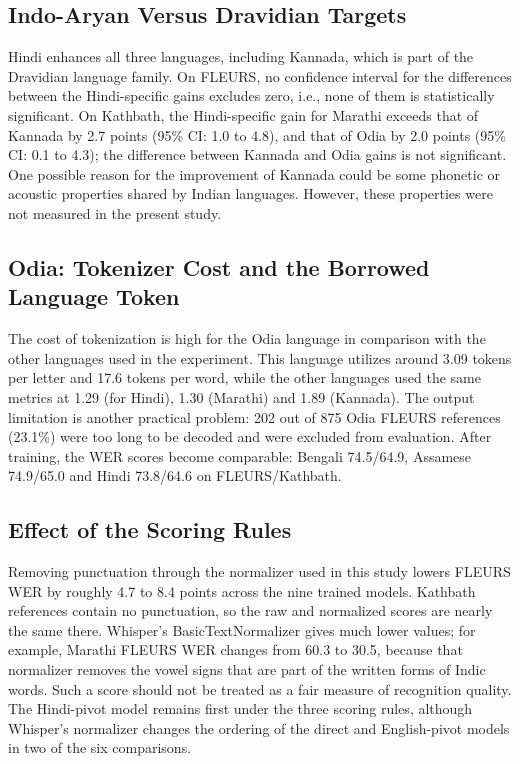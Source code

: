 \documentclass[conference]{IEEEtran}
\begin{document}


\subsection{Indo-Aryan Versus Dravidian Targets}

Hindi enhances all three languages, including Kannada, which is part of the Dravidian language family. On FLEURS, no confidence interval for the differences between the Hindi-specific gains excludes zero, i.e., none of them is statistically significant. On Kathbath, the Hindi-specific gain for Marathi exceeds that of Kannada by 2.7 points (95\% CI: 1.0 to 4.8), and that of Odia by 2.0 points (95\% CI: 0.1 to 4.3); the difference between Kannada and Odia gains is not significant. One possible reason for the improvement of Kannada could be some phonetic or acoustic properties shared by Indian languages. However, these properties were not measured in the present study.

\subsection{Odia: Tokenizer Cost and the Borrowed Language Token}

The cost of tokenization is high for the Odia language in comparison with the other languages used in the experiment. This language utilizes around 3.09 tokens per letter and 17.6 tokens per word, while the other languages used the same metrics at 1.29 (for Hindi), 1.30 (Marathi) and 1.89 (Kannada). The output limitation is another practical problem: 202 out of 875 Odia FLEURS references (23.1\%) were too long to be decoded and were excluded from evaluation. After training, the WER scores become comparable: Bengali 74.5/64.9, Assamese 74.9/65.0 and Hindi 73.8/64.6 on FLEURS/Kathbath.



\subsection{Effect of the Scoring Rules}

Removing
punctuation through the normalizer used in this study lowers FLEURS WER
by roughly 4.7 to 8.4 points across the nine trained models. Kathbath
references contain no punctuation, so the raw and normalized scores are
nearly the same there. Whisper's BasicTextNormalizer gives much lower
values; for example, Marathi FLEURS WER changes from 60.3 to 30.5,
because that normalizer removes the vowel signs that are part of the
written forms of Indic words. Such a score should not be treated as a
fair measure of recognition quality. The Hindi-pivot model remains first
under the three scoring rules, although Whisper's normalizer changes the
ordering of the direct and English-pivot models in two of the six
comparisons.
\end{document}
